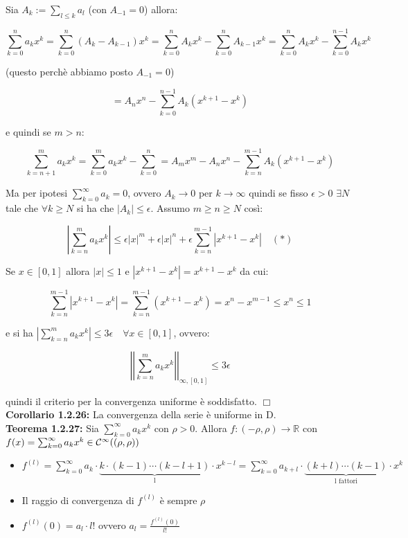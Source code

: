 \documentclass[a4paper,11pt,titlepage]{book}
\begin{document}
Sia $A_k:=\sum_{l\leq k} a_l$ (con $A_{-1}=0$) allora:

$$\sum_{k=0}^na_kx^k=\sum_{k=0}^n(A_k-A_{k-1}) x^k=\sum_{k=0}^nA_kx^k-\sum_{k=0}^nA_{k-1}x^k=\sum_{k=0}^nA_kx^k-\sum_{k=0}^{n-1}A_{k}x^k$$

(questo perchè abbiamo posto $A_{-1}=0$)

$$=A_nx^n-\sum_{k=0}^{n-1}A_{k}(x^{k+1}-x^k)$$

e quindi se $m>n$:

$$\sum_{k=n+1}^ma_kx^k=\sum_{k=0}^ma_kx^k-\sum_{k=0}^n=A_mx^m-A_nx^n-\sum_{k=n}^{m-1}A_k(x^{k+1}-x^k)$$

Ma per ipotesi $\sum_{k=0}^\infty a_k=0$, ovvero $A_k\to 0$ per $k\to\infty$ quindi se fisso $\epsilon >0$ $\exists N$ tale che $\forall k\geq N$ si ha che $|A_k|\leq\epsilon$. Assumo $m\geq n\geq N$ così:

$$\left|\sum_{k=n}^ma_kx^k\right|\leq \epsilon|x|^m+\epsilon|x|^n+\epsilon\sum_{k=n}^{m-1}|x^{k+1}-x^k|\quad (*)$$

Se $x\in[0,1]$ allora $|x|\leq 1$ e $|x^{k+1}-x^k|=x^{k+1}-x^k$ da cui:

$$\sum_{k=n}^{m-1}|x^{k+1}-x^k|=\sum_{k=n}^{m-1}(x^{k+1}-x^k)=x^n-x^{m-1}\leq x^n \leq 1$$

e si ha $|\sum_{k=n}^m a_k x^k|\leq 3\epsilon\quad\forall x\in[0,1]$, ovvero:

$$\left|\left|\sum_{k=n}^m a_k x^k\right|\right|_{\infty,[0,1]}\leq 3\epsilon$$

quindi il criterio per la convergenza uniforme è soddisfatto. $\Box$\\

\textbf{Corollario 1.2.26:} La convergenza della serie è uniforme in D.\\

\textbf{Teorema 1.2.27:} Sia $\sum_{k=0}^\infty a_kx^k$ con $\rho >0$. Allora $f:(-\rho,\rho)\to\mathbb{R}$ con $f(x)=\sum_{k=0}^\infty a_kx^k\in\mathcal{C}^\infty((\-\rho,\rho))$\begin{itemize}
\item $f^{(l)}=\sum_{k=0}^\infty a_k\cdot\underbrace{k \cdot (k-1) \cdots (k-l+1)}_{\mbox{l}}\cdot x^{k-l}=\sum_{k=0}^\infty a_{k+l}\cdot\underbrace{ (k+l) \cdots (k-1)}_{\mbox{l fattori}}\cdot x^{k}$
\item Il raggio di convergenza di $f^{(l)}$ è sempre $\rho$
\item $f^{(l)}(0)=a_l\cdot l!$ ovvero $a_l=\frac{f^{(l)}(0)}{l!}$\\
\end{itemize}
\end{document}
